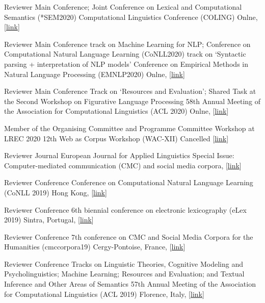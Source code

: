         {Reviewer}
        {Main Conference; Joint Conference on Lexical and Computational Semantics (*SEM2020)}
        {Computational Linguistics Conference (COLING)}
        {Onlne, [\href{https://coling2020.org/}{link}]}
        {}

        {Reviewer}
        {Main Conference track on Machine Learning for NLP; Conference on
         Computational Natural Language Learning (CoNLL2020) track on `Syntactic parsing
         + interpretation of NLP models'} {Conference on Empirical Methods in Natural
         Language Processing (EMNLP2020)}
        {Onlne, [\href{https://coling2020.org/}{link}]}
        {}

        {Reviewer}
        {Main Conference Track on `Resources and Evaluation'; Shared Task at
         the Second Workshop on Figurative Language Processing}
        {58th Annual Meeting of the Association for Computational Linguistics (ACL 2020)}
        {Onlne, [\href{https://www.acl2020.org/}{link}]}
        {}

        {Member of the Organising Committee and Programme Committee}
        {Workshop at LREC 2020}
        {12th Web as Corpus Workshop (WAC-XII)}
        {Cancelled [\href{https://www.sigwac.org.uk/wiki/WAC-XII}{link}]}
        {}

        {Reviewer}
        {Journal}
        {European Journal for Applied Linguistics}
        {Special Issue: Computer-mediated communication (CMC) and social media
         corpora,
         [\href{https://www.degruyter.com/view/journals/eujal/7/2/eujal.7.issue-2.xml}{link}]}
        {}

        {Reviewer}
        {Conference}
        {Conference on Computational Natural Language Learning (CoNLL 2019)}
        {Hong Kong, [\href{https://www.conll.org/cfp-2019}{link}]}
        {}

        {Reviewer}
        {Conference}
        {6th biennial conference on electronic lexicography (eLex 2019)}
        {Sintra, Portugal, [\href{https://elex.link/elex2019/}{link}]}
        {}

        {Reviewer}
        {Conference}
        {7th conference on CMC and Social Media Corpora for the Humanities (cmccorpora19)}
        {Cergy-Pontoise, France, [\href{https://cmccorpora19.sciencesconf.org/}{link}]}
        {}

        {Reviewer}
        {Conference Tracks on Linguistic Theories, Cognitive Modeling and
        Psycholinguistics; Machine Learning; Resources and Evaluation; and
        Textual Inference and Other Areas of Semantics}
        {57th Annual Meeting of the Association for Computational Linguistics (ACL 2019)}
        {Florence, Italy, [\href{http://www.acl2019.org/}{link}]}
        {}

